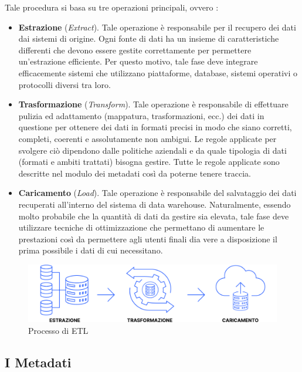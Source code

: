 Tale procedura si basa su tre operazioni principali, ovvero \cite{sciencedirect_data_warehouse_model}:
\begin{itemize}
    \item \textbf{Estrazione} (\textit{Extract}). Tale operazione è responsabile per il recupero dei dati dai sistemi di origine. Ogni fonte di dati ha un insieme di caratteristiche differenti che devono essere gestite correttamente per permettere un'estrazione efficiente. Per questo motivo, tale fase deve integrare efficacemente sistemi che utilizzano piattaforme, database, sistemi operativi o protocolli diversi tra loro.
    \item \textbf{Trasformazione} (\textit{Transform}). Tale operazione è responsabile di effettuare pulizia ed adattamento (mappatura, trasformazioni, ecc.) dei dati in questione per ottenere dei dati in formati precisi in modo che siano corretti, completi, coerenti e assolutamente non ambigui. Le regole applicate per svolgere ciò dipendono dalle politiche aziendali e da quale tipologia di dati (formati e ambiti trattati) bisogna gestire. Tutte le regole applicate sono descritte nel modulo dei metadati così da poterne tenere traccia.
    \item \textbf{Caricamento} (\textit{Load}). Tale operazione è responsabile del salvataggio dei dati recuperati all'interno del sistema di data warehouse. Naturalmente, essendo molto probabile che la quantità di dati da gestire sia elevata, tale fase deve utilizzare tecniche di ottimizzazione che permettano di aumentare le prestazioni così da permettere agli utenti finali dia vere a disposizione il prima possibile i dati di cui necessitano.
\end{itemize}

\begin{figure}[H]
    \centering
    \includegraphics[width=1\linewidth]{figure/capitolo_2/ETL Process.pdf}
    \caption{Processo di ETL}
    \label{fig:ETL Process}
\end{figure}

\subsection{I Metadati}

